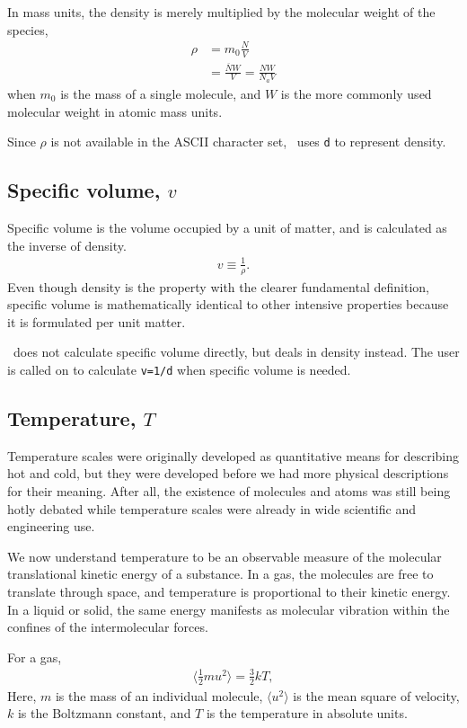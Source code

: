 In mass units, the density is merely multiplied by the molecular weight of the species,
\begin{align}
\rho &= m_0 \frac{N}{V}\\
 &= \frac{\overline{N} W}{V} = \frac{N W}{N_a V}\nonumber
\end{align}
when $m_0$ is the mass of a single molecule, and $W$ is the more commonly used molecular weight in atomic mass units.

Since $\rho$ is not available in the ASCII character set, \PM\ uses \verb|d| to represent density.

\subsection{Specific volume, $v$}

Specific volume is the volume occupied by a unit of matter, and is calculated as the inverse of density.
\begin{align}
v \equiv \frac{1}{\rho}.
\end{align}
Even though density is the property with the clearer fundamental definition, specific volume is mathematically identical to other intensive properties because it is formulated per unit matter.

\PM\ does not calculate specific volume directly, but deals in density instead.  The user is called on to calculate \verb|v=1/d| when specific volume is needed.

\subsection{Temperature, $T$}

Temperature scales were originally developed as quantitative means for describing hot and cold, but they were developed before we had more physical descriptions for their meaning.  After all, the existence of molecules and atoms was still being hotly debated while temperature scales were already in wide scientific and engineering use.

We now understand temperature to be an observable measure of the molecular translational kinetic energy of a substance.  In a gas, the molecules are free to translate through space, and temperature is proportional to their kinetic energy.  In a liquid or solid, the same energy manifests as molecular vibration within the confines of the intermolecular forces.

For a gas,
\begin{align}
\langle \frac{1}{2} m u^2 \rangle = \frac{3}{2} k T,
\end{align}
Here, $m$ is the mass of an individual molecule, $\langle u^2 \rangle$ is the mean square of velocity, $k$ is the Boltzmann constant, and $T$ is the temperature in absolute units.

